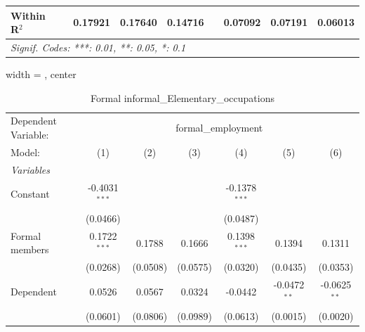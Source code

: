 \begin{table}[htbp]
\begin{tabular}{lcccccccc}
      Within R$^2$              &                         & 0.17921                 & 0.17640                 & 0.14716                 &                         & 0.07092                 & 0.07191                 & 0.06013\\  
      \midrule \midrule
      \multicolumn{9}{l}{\emph{Signif. Codes: ***: 0.01, **: 0.05, *: 0.1}}\\
   \end{tabular}
\end{table}



\begin{table}[htbp]
   \caption{Formal informal\_Elementary\_occupations}
   \centering
   \begin{adjustbox}{width = \textwidth, center}
      \begin{tabular}{lcccccc}
         \tabularnewline \midrule \midrule
         Dependent Variable: & \multicolumn{6}{c}{formal\_employment}\\
         Model:                    & (1)                     & (2)                     & (3)                     & (4)                     & (5)                     & (6)\\  
         \midrule
         \emph{Variables}\\
         Constant                  & -0.4031$^{***}$         &                         &                         & -0.1378$^{***}$         &                         &   \\   
                                   & (0.0466)                &                         &                         & (0.0487)                &                         &   \\   
         Formal members            & 0.1722$^{***}$          & 0.1788                  & 0.1666                  & 0.1398$^{***}$          & 0.1394                  & 0.1311\\   
                                   & (0.0268)                & (0.0508)                & (0.0575)                & (0.0320)                & (0.0435)                & (0.0353)\\   
         Dependent                 & 0.0526                  & 0.0567                  & 0.0324                  & -0.0442                 & -0.0472$^{**}$          & -0.0625$^{**}$\\   
                                   & (0.0601)                & (0.0806)                & (0.0989)                & (0.0613)                & (0.0015)                & (0.0020)\\   

\end{tabular}
\end{adjustbox}
\end{table}
